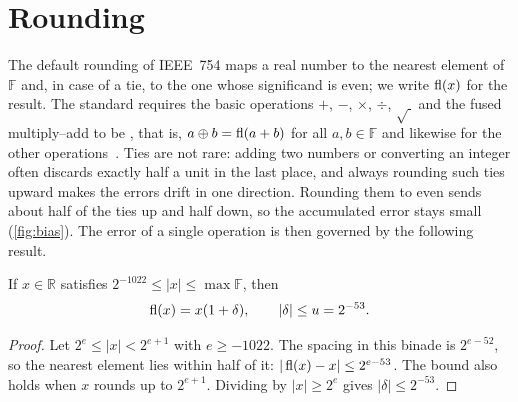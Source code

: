 \section{Rounding}
\label{sec:rounding}

The default rounding of IEEE~754 maps a real number to the nearest element of $\mathbb F$ and, in case of a tie, to the one whose significand is even; we write $\mathop{\mathrm{fl}}\nolimits(x)$ for the result. The standard requires the basic operations $+$, $-$, $\times$, $\div$, $\sqrt{\ }$ and the fused multiply--add to be , that is, $a\oplus b=\mathop{\mathrm{fl}}\nolimits(a+b)$ for all $a,b\in\mathbb F$ and likewise for the other operations~\cite{ieee754-2019}. Ties are not rare: adding two numbers or converting an integer often discards exactly half a unit in the last place, and always rounding such ties upward makes the errors drift in one direction. Rounding them to even sends about half of the ties up and half down, so the accumulated error stays small (\cref{fig:bias}). The error of a single operation is then governed by the following result.

\begin{figure}
\end{figure}

\begin{theorem}
\label{thm:standard-model}
If $x\in\mathbb R$ satisfies $2^{-1022}\le|x|\le\max\mathbb F$, then
\begin{equation}
\mathop{\mathrm{fl}}\nolimits(x)=x(1+\delta),\qquad|\delta|\le u=2^{-53}.
\label{eq:standard-model}
\end{equation}
\end{theorem}

\begin{proof}
Let $2^e\le|x|<2^{e+1}$ with $e\ge-1022$. The spacing in this binade is $2^{e-52}$, so the nearest element lies within half of it: $|\mathop{\mathrm{fl}}\nolimits(x)-x|\le2^{e-53}$. The bound also holds when $x$ rounds up to $2^{e+1}$. Dividing by $|x|\ge2^e$ gives $|\delta|\le2^{-53}$.
\end{proof}

